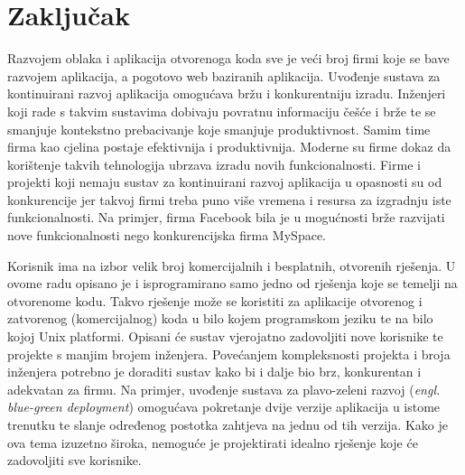 \chapter{Zaključak}
Razvojem oblaka i aplikacija otvorenoga koda sve je veći broj firmi koje se bave razvojem
aplikacija, a pogotovo web baziranih aplikacija. Uvođenje sustava za kontinuirani razvoj aplikacija
omogućava bržu i konkurentniju izradu. Inženjeri koji rade s takvim sustavima dobivaju povratnu
informaciju češće i brže te se smanjuje kontekstno prebacivanje koje smanjuje produktivnost. Samim
time firma kao cjelina postaje efektivnija i produktivnija. Moderne su firme dokaz da korištenje
takvih tehnologija ubrzava izradu novih funkcionalnosti. Firme i projekti koji nemaju sustav za
kontinuirani razvoj aplikacija u opasnosti su od konkurencije jer takvoj firmi treba puno više
vremena i resursa za izgradnju iste funkcionalnosti. Na primjer, firma Facebook bila je u mogućnosti
brže razvijati nove funkcionalnosti nego konkurencijska firma MySpace.

Korisnik ima na izbor velik broj komercijalnih i besplatnih, otvorenih rješenja. U ovome radu
opisano je i isprogramirano samo jedno od rješenja koje se temelji na otvorenome kodu. Takvo
rješenje može se koristiti za aplikacije otvorenog i zatvorenog (komercijalnog) koda u bilo kojem
programskom jeziku te na bilo kojoj Unix platformi. Opisani će sustav vjerojatno zadovoljiti nove
korisnike te projekte s manjim brojem inženjera. Povećanjem kompleksnosti projekta i broja
inženjera potrebno je doraditi sustav kako bi i dalje bio brz, konkurentan i adekvatan za firmu. Na
primjer, uvođenje sustava za plavo-zeleni razvoj (\textit{engl. blue-green deployment}) omogućava
pokretanje dvije verzije aplikacija u istome trenutku te slanje određenog postotka zahtjeva na jednu
od tih verzija.  Kako je ova tema izuzetno široka, nemoguće je projektirati idealno rješenje koje
će zadovoljiti sve
korisnike.

